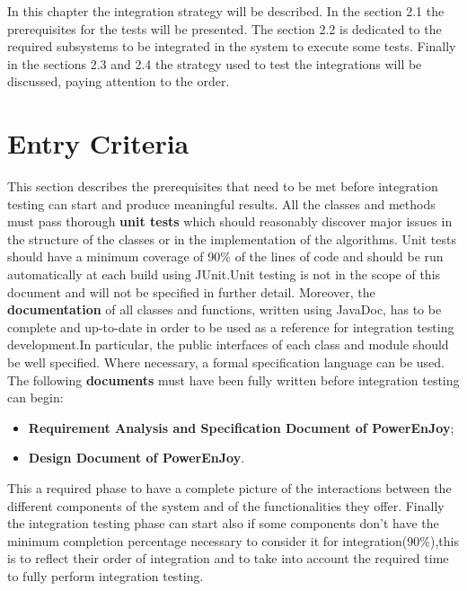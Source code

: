 In this chapter the integration strategy will be described. In the section 2.1
the prerequisites for the tests will be presented. The section 2.2 is dedicated to
the required subsystems to be integrated in the system to execute some tests.
Finally in the sections 2.3 and 2.4 the strategy used to test the integrations will
be discussed, paying attention to the order.
\section{Entry Criteria}
This section describes the prerequisites that need to be met before integration
testing can start and produce meaningful results.
All the classes and methods must pass thorough \textbf{unit tests } which should
reasonably discover major issues in the structure of the classes or in the implementation
of the algorithms. Unit tests should have a minimum coverage
of 90\% of the lines of code and should be run automatically at each build
using JUnit.Unit testing is not in the scope of this document and will not
be specified in further detail.
Moreover, the \textbf{documentation} of all classes and functions, written using
JavaDoc, has to be complete and up-to-date in order to be used as a reference
for integration testing development.In particular, the public interfaces of
each class and module should be well specified. Where necessary, a formal
specification language can be used.
The following \textbf{documents} must have been fully written before integration testing can
begin:

\begin{itemize}
\item \textbf{Requirement Analysis and Specification Document of PowerEnJoy};
\item \textbf{Design Document of PowerEnJoy}.
\end{itemize}

This a required phase to have a complete picture of the interactions between the different components of the system and of the functionalities they offer.
Finally the integration testing phase can start also if some components don't have the minimum completion percentage necessary to consider it for integration(90\%),this is to reflect their order of integration and to take into account the required time to fully perform integration testing.

